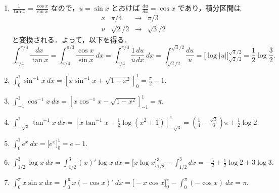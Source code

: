 \documentclass[11pt, uplatex, dvipdfmx]{jsarticle}
\newcommand{\ds}{\displaystyle}
\begin{document}
\begin{enumerate}[(1)]
   \item $\frac{1}{\tan x} = \frac{\cos x}{\sin x}$ なので，$u=\sin x$
     とおけば $\frac{du}{dx} = \cos x$ であり，積分区間は
     \[
       \begin{array}{c|ccc}
         x & \pi/4 & \to & \pi/3\\ \hline
         u & \sqrt{2}/2 & \to & \sqrt{3}/2
       \end{array}
     \]
     と変換される．よって，以下を得る．
     \[
       \int_{\pi/4}^{\pi/3} \frac{dx}{\tan x} = \int_{\pi/4}^{\pi/3}
       \frac{\cos x}{\sin x} \ dx = \int_{\pi/4}^{\pi/3} \frac{1}{u}
       \frac{du}{dx} \ dx = \int_{\sqrt{2}/2}^{\sqrt{3}/2}
       \frac{du}{u} = \Big[ \log|u| \Big]_{\sqrt{2}/2}^{\sqrt{3}/2}
       =\frac{1}{2}\log \frac{3}{2}.
     \]

   \item $\ds \int_{0}^{1} \sin^{-1}x \ dx = \left[ x \sin^{-1} x + \sqrt{1-x^2} \right]_{0}^{1}= \frac{\pi}{2}-1.$

   \item $\ds \int_{-1}^{1} \cos^{-1}x \ dx = \left[ x \cos^{-1} x - \sqrt{1-x^2} \right]_{-1}^{1}= \pi.$

   \item
     $\ds \int_{-\sqrt{3}}^{1} \tan^{-1}x \ dx = \left[ x \tan^{-1}x
       -\frac{1}{2} \log (x^2+1)\right]_{-\sqrt{3}}^{1} = \left(
       \frac{1}{4} - \frac{\sqrt{3}}{3}\right) \pi + \frac{1}{2} \log 2.$

   \item $\ds \int_0^1 e^x \ dx =\Big[ e^x \Big]_{0}^{1} = e-1.$

   \item
     $\ds \int_{1/2}^{3} \log x \ dx = \int_{1/2}^{3} \left( x \right)'
     \log x \ dx = \Big[ x \log x \Big]_{1/2}^{3} - \int_{1/2}^{3} dx =
     -\frac{5}{2} + \frac{1}{2} \log 2 + 3 \log 3.$

   \item $\ds \int_{0}^{\pi} x \sin x \ dx = \int_{0}^{\pi}x \left( -\cos x\right)' \ dx
     = \Big[ - x \cos x \Big]_{0}^{\pi} - \int_{0}^{\pi} \left(-\cos x\right) \ dx = \pi.$ 


\end{enumerate}
\end{document}
